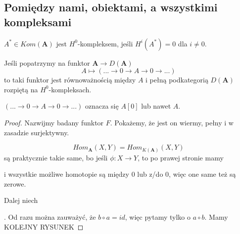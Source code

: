 \subsection{Pomiędzy nami, obiektami, a wszystkimi kompleksami}

\begin{definition}
  $A^*\in Kom(\mathbf{A})$ jest $H^0$-kompleksem, jeśli $H^i(A^*)=0$ dla $i\neq 0$.
\end{definition}

\begin{fact}\label{fakt 10.5}
  Jeśli popatrzymy na funktor $\mathbf{A}\to D(\mathbf{A})$
  $$A\mapsto (...\to 0\to A\to 0\to ...)$$
  to taki funktor jest równoważnością między $A$ i pełną podkategorią $D(\mathbf{A})$ rozpiętą na $H^0$-kompleksach.
\end{fact}

$(...\to0\to A\to0\to...)$ oznacza się $A[0]$ lub nawet $A$.

\begin{proof}
  Nazwijmy badany funktor $F$. Pokażemy, że jest on wiermy, pełny i w zasadzie surjektywny.

  $$Hom_{\mathbf{A}}(X, Y)=Hom_{K(\mathbf{A})}(X, Y)$$
  są praktycznie takie same, bo jeśli $\phi: X\to Y$, to po prawej stronie mamy
  \begin{center}\end{center}
  i wszystkie możliwe homotopie są między $0$ lub z/do $0$, więc one same też są zerowe.

  Dalej niech . Od razu można zauważyć, że $b\circ a=id$, więc pytamy tylko o $a\circ b$. Mamy 
  {\large\color{red}KOLEJNY RYSUNEK}
\end{proof}
